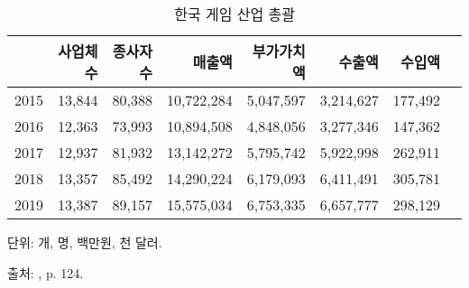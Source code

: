 	
			\begin{table}[htp]
			\begin{center}
			\begin{threeparttable}
			\caption{한국 게임 산업 총괄}\label{tab:koreagameindustry}
			\begin{tabularx}{\textwidth}{lrrrrrrr}
			\toprule
			& 사업체 수 & 종사자 수 & 매출액 & 부가가치액 & 수출액 & 수입액 \\
			\midrule
			2015 & 13,844 & 80,388 & 10,722,284 & 5,047,597 & 3,214,627 & 177,492\\
			2016  & 12,363 & 73,993 & 10,894,508 & 4,848,056 & 3,277,346 & 147,362 \\
			2017  & 12,937 & 81,932 & 13,142,272& 5,795,742& 5,922,998 & 262,911\\
			2018  & 13,357 & 85,492 & 14,290,224 & 6,179,093 & 6,411,491 & 305,781\\
			2019  & 13,387 & 89,157 & 15,575,034 & 6,753,335 & 6,657,777 & 298,129 \\
			\bottomrule
			\end{tabularx}
			\begin{tablenotes}
			\small
			\item 단위: 개, 명, 백만원, 천 달러.
			\item 출처: \cite{munhwacheyuggwangwangbu:2021wo}, p. 124.
			\end{tablenotes}
			\end{threeparttable}
			\end{center}
			\end{table}%
			
